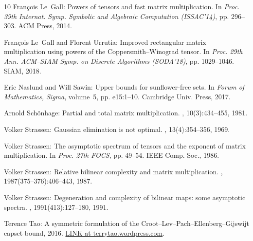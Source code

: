 \documentclass[11pt]{article}
\numberwithin{equation}{section}
\theoremstyle{definition}
\theoremstyle{plain}
\theoremstyle{definition}
\begin{document}
\begin{thebibliography}{10}
{\sc Fran{\c{c}}ois Le~Gall}: Powers of tensors and fast matrix multiplication.
\newblock In {\em Proc. 39th Internat. Symp. Symbolic and Algebraic Computation
  (ISSAC'14)}, pp. 296--303. ACM Press, 2014.
\newblock [\epfmtdoi{10.1145/2608628.2608664}]

{\sc Fran{\c{c}}ois Le~Gall and Florent Urrutia}: Improved rectangular matrix
  multiplication using powers of the {Coppersmith--Winograd} tensor.
\newblock In {\em Proc. 29th Ann. ACM--SIAM Symp. on Discrete Algorithms
  (SODA'18)}, pp. 1029--1046. SIAM, 2018.
\newblock [\epfmtdoi{10.1137/1.9781611975031.67}]

{\sc Eric Naslund and Will Sawin}: Upper bounds for sunflower-free sets.
\newblock In {\em Forum of Mathematics, Sigma}, volume~5, pp. e15:1--10.
  Cambridge Univ. Press, 2017.

{\sc Arnold Sch\"{o}nhage}: Partial and total matrix multiplication.
, 10(3):434--455, 1981.
\newblock [\epfmtdoi{10.1137/0210032}]

{\sc Volker Strassen}: Gaussian elimination is not optimal.
, 13(4):354--356, 1969.
\newblock [\epfmtdoi{10.1007/BF02165411}]

{\sc Volker Strassen}: The asymptotic spectrum of tensors and the exponent of
  matrix multiplication.
\newblock In {\em Proc. 27th FOCS}, pp. 49--54. IEEE Comp. Soc., 1986.

{\sc Volker Strassen}: Relative bilinear complexity and matrix multiplication.
, 1987(375--376):406--443, 1987.

{\sc Volker Strassen}: Degeneration and complexity of bilinear maps: some
  asymptotic spectra.
, 1991(413):127--180, 1991.

{\sc Terence Tao}: A symmetric formulation of the
  {Croot--Lev--Pach--Ellenberg--Gijswijt} capset bound, 2016.
\newblock
  \href{https://terrytao.wordpress.com/2016/05/18/a-symmetric-formulation-of-the-croot-lev-pach-ellenberg-gijswijt-capset-bound/}{LINK
  at terrytao.wordpress.com}.


\end{thebibliography}
\end{document}
